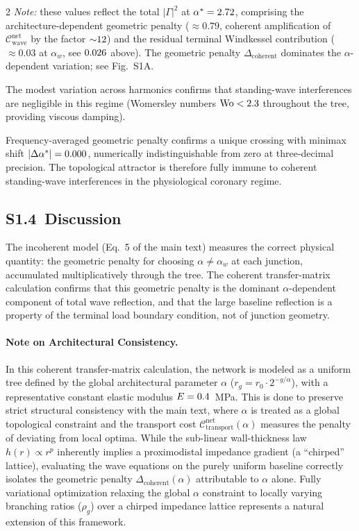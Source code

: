 \documentclass[11pt,a4paper]{article}
\begin{document}
\begin{multicols}{2}
\emph{Note:} these values reflect the total $|\Gamma|^2$ at $\alpha^* = 2.72$, comprising the architecture-dependent geometric penalty (${\approx}0.79$, coherent amplification of $\mathcal{C}^{\mathrm{net}}_{\mathrm{wave}}$ by the factor ${\sim}12$) and the residual terminal Windkessel contribution (${\approx}0.03$ at $\alpha_w$, see $0.026$ above). The geometric penalty $\Delta_\mathrm{coherent}$ dominates the $\alpha$-dependent variation; see Fig.~S1A.

The modest variation across harmonics confirms that standing-wave interferences
are negligible in this regime (Womersley numbers $\mathrm{Wo} <
2.3$ throughout the tree, providing viscous damping).

Frequency-averaged geometric penalty confirms a unique crossing with minimax
shift $|\Delta\alpha^*| = 0.000$, numerically indistinguishable from
zero at three-decimal precision. The topological attractor is therefore fully
immune to coherent standing-wave interferences in the physiological coronary
regime.

\subsection*{S1.4\ Discussion}

The incoherent model (Eq.~5 of the main text) measures the correct physical
quantity: the geometric penalty for choosing $\alpha \neq \alpha_w$ at each
junction, accumulated multiplicatively through the tree. The coherent
transfer-matrix calculation confirms that this geometric penalty is the dominant
$\alpha$-dependent component of total wave reflection, and that the large
baseline reflection is a property of the terminal load boundary condition, not
of junction geometry.

\paragraph{Note on Architectural Consistency.}
In this coherent transfer-matrix calculation, the network is modeled as a
uniform tree defined by the global architectural parameter $\alpha$ ($r_g = r_0
\cdot 2^{-g/\alpha}$), with a representative constant elastic modulus
$E=0.4$~MPa. This is done to preserve strict structural
consistency with the main text, where $\alpha$ is treated as a global
topological constraint and the transport cost
$\mathcal{C}^{\mathrm{net}}_{\mathrm{transport}}(\alpha)$ measures the penalty
of deviating from local optima. While the sub-linear wall-thickness law $h(r)
\propto r^p$ inherently implies a proximodistal impedance gradient (a
``chirped'' lattice), evaluating the wave equations on the purely uniform
baseline correctly isolates the geometric penalty
$\Delta_{\mathrm{coherent}}(\alpha)$ attributable to $\alpha$ alone. Fully
variational optimization relaxing the global $\alpha$ constraint to locally
varying branching ratios ($\rho_g$) over a chirped impedance lattice represents
a natural extension of this framework.


\end{multicols}
\end{document}
